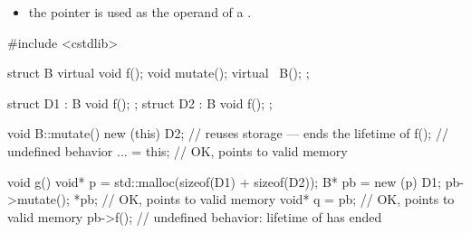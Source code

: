 \begin{itemize}
%
%
%
%
%
  to a base class thereof, or
\item
  the pointer is used as the operand of a
  .
%
%
%
%
%
\end{itemize}
\begin{example}
\begin{codeblock}
#include <cstdlib>

struct B {
  virtual void f();
  void mutate();
  virtual ~B();
};

struct D1 : B { void f(); };
struct D2 : B { void f(); };

void B::mutate() {
  new (this) D2;    // reuses storage --- ends the lifetime of 
  f();              // undefined behavior
  ... = this;       // OK,  points to valid memory
}

void g() {
  void* p = std::malloc(sizeof(D1) + sizeof(D2));
  B* pb = new (p) D1;
  pb->mutate();
  *pb;              // OK,  points to valid memory
  void* q = pb;     // OK,  points to valid memory
  pb->f();          // undefined behavior: lifetime of  has ended
}
\end{codeblock}
\end{example}

